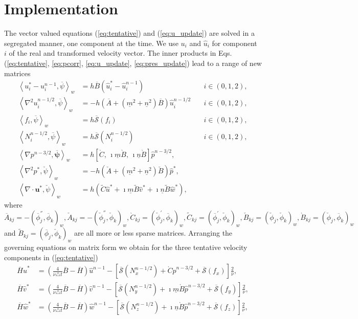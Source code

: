 \documentclass[11pt, oneside]{article}
\newcommand{\N}[1]{\check{#1}}
\newcommand{\D}[1]{\overline{#1}}
\begin{document}
\section{Implementation}
The vector valued equations (\ref{eq:tentative}) and (\ref{eq:u_update}) are solved in a segregated manner, one component at the time. We use $u_i$ and $\hat{u}_i$ for component $i$ of the real and transformed velocity vector. The inner products in Eqs. (\ref{eq:tentative}, \ref{eq:pcorr}, \ref{eq:u_update}, \ref{eq:pres_update}) lead to a range of new matrices
\begin{align}
 \left< u_i^* - u_i^{n-1}, \D{\psi}\right>_w &= h\D{B}\left({\hat{u}}_i^*-{\hat{u}}_i^{n-1} \right) \quad &i \in (0,1,2), \\ 
 \left<\nabla^2 {u}_i^{n-1/2}, \D{\psi}\right>_w &= -h  \left( \D{A} +(\underline{m}^2+\underline{n}^2)\D{B}\right) \hat{u}_i^{n-1/2} \quad &i \in (0,1,2), \\ 
 \left< f_i, \D{\psi}\right>_w &= h\D{\mathcal{S}}(f_i) &i \in (0,1,2), \\
 \left<N_i^{n-1/2}, \D{\psi} \right>_w &= h\D{\mathcal{S}}(N_i^{n-1/2}) &i \in (0,1,2), \\  
 \left< \nabla p^{n-3/2}, \bm{\D{\psi}} \right>_w &= h\left[\grave{C},\, \imath \underline{m} \grave{B},\, \imath \underline{n} \grave{B} \right] \hat{p}^{n-3/2}, \\ 
 \left< \nabla^2 p^*, \N{\psi} \right>_w &= -h\left(\N{A} +(\underline{m}^2 + \underline{n}^2)\N{B} \right) \hat{p}^*, \\ 
 \left<\nabla \cdot \bm{u}^*, \N{\psi} \right>_w &= h\left( \tilde{C} \hat{u}^* + \imath \underline{m} \tilde{B} \hat{v}^* + \imath \underline{n} \tilde{B} \hat{w}^* \right), 
\end{align}
where $\D{A}_{kj} = -\left(\D{\phi}^{''}_{j}, \D{\phi}_{k} \right)_w, \N{A}_{kj} = -\left(\N{\phi}^{''}_{j}, \N{\phi}_{k} \right)_w,  \grave{C}_{kj} = \left(\N{\phi}^{'}_j, \D{\phi}_k \right)_w, \tilde{C}_{kj} = (\D{\phi}^{'}_j, \N{\phi}_k)_w, \N{B}_{kj} = \left( \N{\phi}_j, \N{\phi}_k \right)_w, \grave{B}_{kj} = (\N{\phi}_j, \D{\phi}_k)_w$ and $\tilde{B}_{kj} = (\D{\phi}_j, \N{\phi}_k)_w$ are all more or less sparse matrices. Arranging the governing equations on matrix form we obtain for the three tentative velocity components in (\ref{eq:tentative})
\begin{align}
\D{H} \hat{u}^* &= \left(\frac{4}{\nu \triangle t} \D{B}-\D{H}\right) \hat{u}^{n-1} - \left[\D{\mathcal{S}}(N_x^{n-1/2}) + \grave{C} \hat{p}^{n-3/2} + \D{\mathcal{S}}(f_x)\right]\frac{2}{\nu}, \label{eq:tentativeUA}\\
\D{H} \hat{v}^* &=  \left(\frac{4}{\nu \triangle t} \D{B}-\D{H}\right)\hat{v}^{n-1} - \left[\D{\mathcal{S}}(N_y^{n-1/2}) + \imath \underline{m} \grave{B} \hat{p}^{n-3/2} + \D{\mathcal{S}}(f_y)\right]\frac{2}{\nu}, \label{eq:tentativeVA}\\
\D{H} \hat{w}^* &= \left(\frac{4}{\nu \triangle t} \D{B}-\D{H}\right) \hat{w}^{n-1} - \left[\D{\mathcal{S}}(N_z^{n-1/2}) + \imath \underline{n} \grave{B} \hat{p}^{n-3/2} + \D{\mathcal{S}}(f_z)\right]\frac{2}{\nu},\label{eq:tentativeWA}
\end{align}
\end{document}
